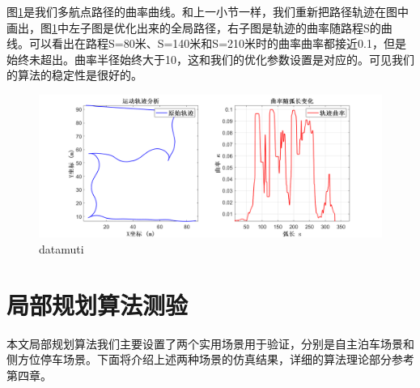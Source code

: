 \documentclass[master,academic]{ysuthesis} %
\begin{document}
		图\ref{fig:datamuti}是我们多航点路径的曲率曲线。和上一小节一样，我们重新把路径轨迹在图中画出，图\ref{fig:datamuti}中左子图是优化出来的全局路径，右子图是轨迹的曲率随路程S的曲线。可以看出在路程S=80米、S=140米和S=210米时的曲率曲率都接近0.1，但是始终未超出。曲率半径始终大于10，这和我们的优化参数设置是对应的。可见我们的算法的稳定性是很好的。
		\begin{figure}[!ht]
			\centering
			\includegraphics[width=1\textwidth]{datamuti.png}
			\caption{datamuti}
			\label{fig:datamuti}
		\end{figure}

	\section{局部规划算法测验}
	本文局部规划算法我们主要设置了两个实用场景用于验证，分别是自主泊车场景和侧方位停车场景。下面将介绍上述两种场景的仿真结果，详细的算法理论部分参考第四章。
\end{document}
